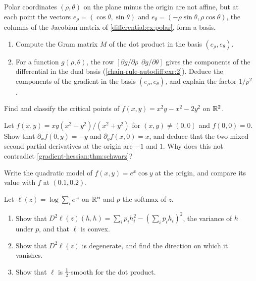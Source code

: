 \begin{notechapter}
\begin{exercise}\label{gradient-hessian:exr:2}
Polar coordinates $(\rho, \theta)$ on the plane minus the origin are
not affine, but at each point the vectors
$e_\rho = (\cos\theta, \sin\theta)$ and
$e_\theta = (-\rho\sin\theta, \rho\cos\theta)$, the columns of the
Jacobian matrix of \cref{differential:ex:polar}, form a basis.
\begin{enumerate}[nosep]
  \item Compute the Gram matrix $M$ of the dot product in the basis
        $(e_\rho, e_\theta)$.
  \item For a function $g(\rho, \theta)$, the row
        $[\partial g/\partial\rho\ \ \partial g/\partial\theta]$ gives the
        components of the differential in the dual basis
        (\cref{chain-rule-autodiff:exr:2}). Deduce the components of the
        gradient in the basis $(e_\rho, e_\theta)$, and explain the
        factor $1/\rho^2$.
\end{enumerate}
\end{exercise}

\begin{exercise}\label{gradient-hessian:exr:3}
Find and classify the critical points of
$f(x, y) = x^2y - x^2 - 2y^2$ on $\mathbb{R}^2$.
\end{exercise}

\begin{exercise}\label{gradient-hessian:exr:4}
Let $f(x, y) = xy(x^2 - y^2)/(x^2 + y^2)$ for $(x, y)\neq(0, 0)$ and
$f(0, 0) = 0$. Show that $\partial_xf(0, y) = -y$ and
$\partial_yf(x, 0) = x$, and deduce that the two mixed second partial
derivatives at the origin are $-1$ and $1$. Why does this not contradict
\cref{gradient-hessian:thm:schwarz}?
\end{exercise}

\begin{exercise}\label{gradient-hessian:exr:5}
Write the quadratic model of $f(x, y) = e^x\cos y$ at the origin, and
compare its value with $f$ at $(0.1, 0.2)$.
\end{exercise}

\begin{exercise}\label{gradient-hessian:exr:6}
Let $\ell(z) = \log\sum_ie^{z_i}$ on $\mathbb{R}^n$ and $p$ the softmax of $z$.
\begin{enumerate}[nosep]
  \item Show that $D^2\ell(z)(h, h) = \sum_ip_ih_i^2 - (\sum_ip_ih_i)^2$,
        the variance of $h$ under $p$, and that $\ell$ is convex.
  \item Show that $D^2\ell(z)$ is degenerate, and find the direction on
        which it vanishes.
  \item Show that $\ell$ is $\frac12$-smooth for the dot product.
\end{enumerate}
\end{exercise}


\end{notechapter}
